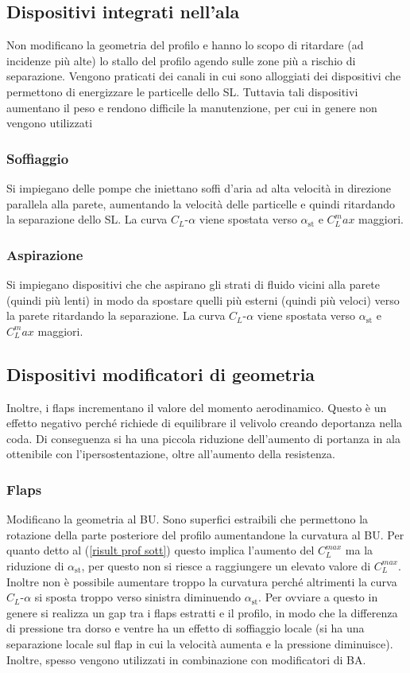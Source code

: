 \documentclass[11pt,a4paper]{report}
\begin{document}
		\subsection{Dispositivi integrati nell'ala}
		Non modificano la geometria del profilo e hanno lo scopo di ritardare (ad incidenze più alte) lo stallo del profilo agendo sulle zone più a rischio di separazione. Vengono praticati dei canali in cui sono alloggiati dei dispositivi che permettono di energizzare le particelle dello SL. Tuttavia tali dispositivi aumentano il peso e rendono difficile la manutenzione, per cui in genere non vengono utilizzati
			\subsubsection{Soffiaggio}
			Si impiegano delle pompe che iniettano soffi d'aria ad alta velocità in direzione parallela alla parete, aumentando la velocità delle particelle e quindi ritardando la separazione dello SL. La curva $C_L$-$\alpha$ viene spostata verso $\alpha_\mathrm{st}$ e $C_L^max$ maggiori.
			\subsubsection{Aspirazione}
			Si impiegano dispositivi che che aspirano gli strati di fluido vicini alla parete (quindi più lenti) in modo da spostare quelli più esterni (quindi più veloci) verso la parete ritardando la separazione. La curva $C_L$-$\alpha$ viene spostata verso $\alpha_\mathrm{st}$ e $C_L^max$ maggiori.
		\subsection{Dispositivi modificatori di geometria}
		 Inoltre, i flaps incrementano il valore del momento aerodinamico. Questo è un effetto negativo perché richiede di equilibrare il velivolo creando deportanza nella coda. Di conseguenza si ha una piccola riduzione dell'aumento di portanza in ala ottenibile con l'ipersostentazione, oltre all'aumento della resistenza.
			\subsubsection{Flaps}	\label{flap}
			Modificano la geometria al BU. Sono superfici estraibili che permettono la rotazione della parte posteriore del profilo aumentandone la curvatura al BU. Per quanto detto al (\ref{risult prof sott}) questo implica l'aumento del $C_L^{max}$ ma la riduzione di $\alpha_\mathrm{st}$, per questo non si riesce a raggiungere un elevato valore di $C_L^{max}$. Inoltre non è possibile aumentare troppo la curvatura perché altrimenti la curva $C_L$-$\alpha$ si sposta troppo verso sinistra diminuendo $\alpha_\mathrm{st}$.	Per ovviare a questo in genere si realizza un gap tra i flaps estratti e il profilo, in modo che la differenza di pressione tra dorso e ventre ha un effetto di soffiaggio locale (si ha una separazione locale sul flap in cui la velocità aumenta e la pressione diminuisce). Inoltre, spesso vengono utilizzati in combinazione con modificatori di BA.
\end{document}
